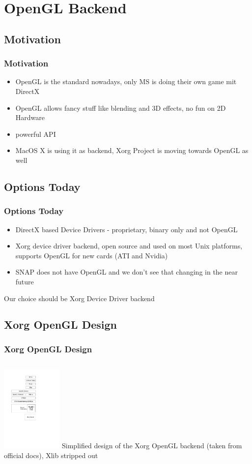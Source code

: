 \documentclass[handout]{beamer}
\begin{document}
\section{OpenGL Backend}

\subsection{Motivation}
\begin{frame}
\frametitle{Motivation}
	\begin{itemize}
      \item OpenGL is the standard nowadays, only MS is doing their own game mit DirectX
      \item OpenGL allows fancy stuff like blending and 3D effects, no fun on 2D Hardware
      \item powerful API
      \item MacOS X is using it as backend, Xorg Project is moving towards OpenGL as well
	\end{itemize}
\end{frame}

\subsection{Options Today}
\begin{frame}
\frametitle{Options Today}
	\begin{itemize}
      \item DirectX based Device Drivers - proprietary, binary only and not OpenGL
      \item Xorg device driver backend, open source and used on most Unix platforms, supports OpenGL for new cards (ATI and Nvidia)
      \item SNAP does not have OpenGL and we don't see that changing in the near future
    \end{itemize}
    Our choice should be Xorg Device Driver backend
\end{frame}

\subsection{Xorg OpenGL Design}
\begin{frame}
\frametitle{Xorg OpenGL Design}
	\begin{columns}[t]
		\column[T]{5cm}
			\includegraphics[width=3cm]{ogl-backend.pdf}
		\column{5cm}
		 	Simplified design of the Xorg OpenGL backend (taken from official docs), Xlib stripped out
	\end{columns}
\end{frame}
\end{document}
